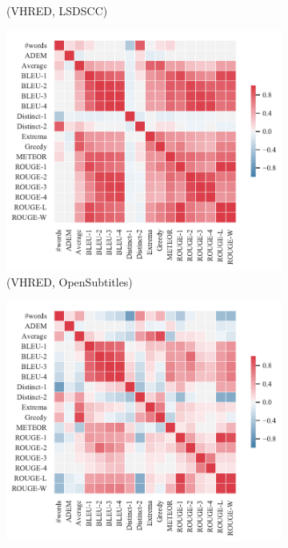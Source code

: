 \begin{figure}[htbp]
\begin{subfigure}{0.35\linewidth}
        \caption{(VHRED, LSDSCC)}
    \end{subfigure}%
    \begin{subfigure}{0.35\linewidth}
        \centering
        \includegraphics[width=\linewidth]{figure/plot/heatmap/v4/pearson/vhred/opensub/plot.pdf}
        \caption{(VHRED, OpenSubtitles)}
    \end{subfigure}%
    \begin{subfigure}{0.35\linewidth}
        \centering
        \includegraphics[width=\linewidth]{figure/plot/heatmap/v4/pearson/vhred/ubuntu/plot.pdf}

\end{subfigure}
\end{figure}
